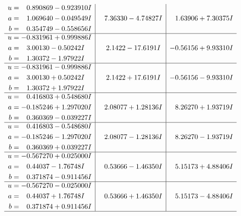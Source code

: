 \documentclass[1p]{elsarticle_modified}
\theoremstyle{definition}
\begin{document}
$$\begin{array}{c|c|c}
\begin{aligned}
u &= \phantom{-}0.890869 - 0.923910 I \\
a &= \phantom{-}1.069640 - 0.049549 I \\
b &= \phantom{-}0.354749 - 0.558656 I\end{aligned}
 & \phantom{-}7.36330 - 4.74827 I & \phantom{-}1.63906 + 7.30375 I \\ \hline\begin{aligned}
u &= -0.831961 + 0.999886 I \\
a &= \phantom{-}3.00130 - 0.50242 I \\
b &= \phantom{-}1.30372 - 1.97922 I\end{aligned}
 & \phantom{-}2.1422 - 17.6191 I & -0.56156 + 9.93310 I \\ \hline\begin{aligned}
u &= -0.831961 - 0.999886 I \\
a &= \phantom{-}3.00130 + 0.50242 I \\
b &= \phantom{-}1.30372 + 1.97922 I\end{aligned}
 & \phantom{-}2.1422 + 17.6191 I & -0.56156 - 9.93310 I \\ \hline\begin{aligned}
u &= \phantom{-}0.416803 + 0.548680 I \\
a &= -0.185246 + 1.297020 I \\
b &= \phantom{-}0.360369 - 0.039227 I\end{aligned}
 & \phantom{-}2.08077 + 1.28136 I & \phantom{-}8.26270 + 1.93719 I \\ \hline\begin{aligned}
u &= \phantom{-}0.416803 - 0.548680 I \\
a &= -0.185246 - 1.297020 I \\
b &= \phantom{-}0.360369 + 0.039227 I\end{aligned}
 & \phantom{-}2.08077 - 1.28136 I & \phantom{-}8.26270 - 1.93719 I \\ \hline\begin{aligned}
u &= -0.567270 + 0.025000 I \\
a &= \phantom{-}0.44037 - 1.76748 I \\
b &= \phantom{-}0.371874 - 0.911456 I\end{aligned}
 & \phantom{-}0.53666 - 1.46350 I & \phantom{-}5.15173 + 4.88406 I \\ \hline\begin{aligned}
u &= -0.567270 - 0.025000 I \\
a &= \phantom{-}0.44037 + 1.76748 I \\
b &= \phantom{-}0.371874 + 0.911456 I\end{aligned}
 & \phantom{-}0.53666 + 1.46350 I & \phantom{-}5.15173 - 4.88406 I\\
 \hline 
 \end{array}$$\newpage\newpage\renewcommand{\arraystretch}{1}
\end{document}
